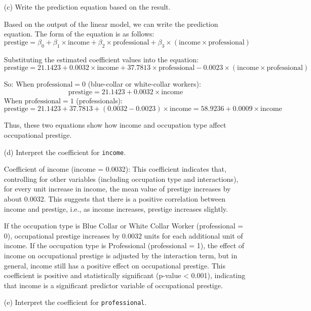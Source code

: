 \documentclass[12pt,letterpaper]{article}
\begin{document}
\begin{enumerate}
	
	\item [(c)]
	Write the prediction equation based on the result.
	
Based on the output of the linear model, we can write the prediction equation. The form of the equation is as follows:
\[
\text{prestige} = \beta_0 + \beta_1 \times \text{income} + \beta_2 \times \text{professional} + \beta_3 \times (\text{income} \times \text{professional})
\]

Substituting the estimated coefficient values into the equation:
\[
\text{prestige} = 21.1423 + 0.0032 \times \text{income} + 37.7813 \times \text{professional} - 0.0023 \times (\text{income} \times \text{professional})
\]

So:
 When \(\text{professional} = 0\) (blue-collar or white-collar workers):
\[
\text{prestige} = 21.1423 + 0.0032 \times \text{income}
\]
 When \(\text{professional} = 1\) (professionals):
\[
\text{prestige} = 21.1423 + 37.7813 + (0.0032 - 0.0023) \times \text{income} = 58.9236 + 0.0009 \times \text{income}
\]

Thus, these two equations show how income and occupation type affect occupational prestige.

	
	
\newpage
	\item [(d)]
	Interpret the coefficient for \texttt{income}.
	
	Coefficient of income (income = 0.0032): This coefficient indicates that, controlling for other variables (including occupation type and interactions), for every unit increase in income, the mean value of prestige increases by about 0.0032. This suggests that there is a positive correlation between income and prestige, i.e., as income increases, prestige increases slightly.
	
	If the occupation type is Blue Collar or White Collar Worker (professional = 0), occupational prestige increases by 0.0032 units for each additional unit of income.
	If the occupation type is Professional (professional = 1), the effect of income on occupational prestige is adjusted by the interaction term, but in general, income still has a positive effect on occupational prestige.
	This coefficient is positive and statistically significant (p-value < 0.001), indicating that income is a significant predictor variable of occupational prestige.
	
	
	
	\vspace{1cm}	
	\item [(e)]
	Interpret the coefficient for \texttt{professional}.
	

\end{enumerate}
\end{document}
